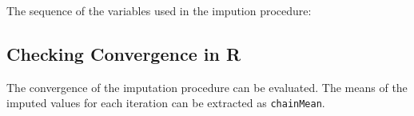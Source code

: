 \documentclass[
]{book}
\newenvironment{Shaded}{\begin{snugshade}}{\end{snugshade}}
\newcommand{\NormalTok}[1]{#1}
\newcommand{\SpecialCharTok}[1]{\textcolor[rgb]{0.00,0.00,0.00}{#1}}
\begin{document}
\begin{Shaded}
\end{Shaded}

The sequence of the variables used in the impution procedure:

\begin{Shaded}
\end{Shaded}

\hypertarget{checking-convergence-in-r}{%
\subsection{Checking Convergence in R}\label{checking-convergence-in-r}}

The convergence of the imputation procedure can be evaluated. The means of the imputed values for each iteration can be extracted as \texttt{chainMean}.

\begin{Shaded}
\end{Shaded}
\end{document}
